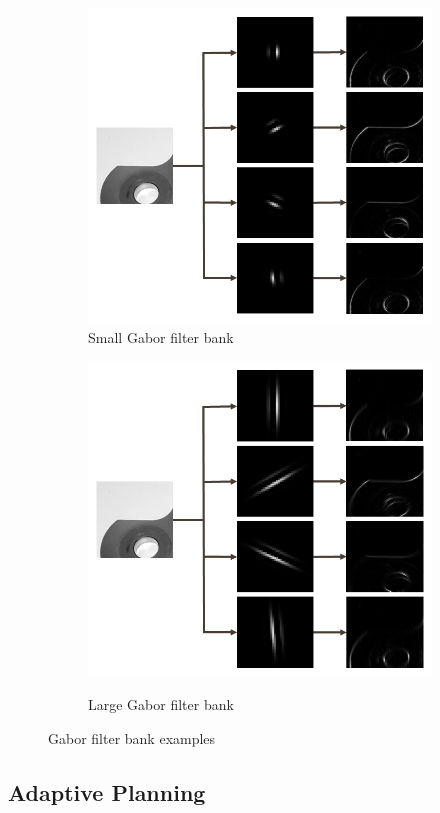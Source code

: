 \documentclass[letterpaper, 10 pt, conference]{ieeeconf}  %
\begin{document}
\begin{figure}
    \centering
    \begin{subfigure}[b]{.49\textwidth}
        \centering
        \includegraphics[width=.65\textwidth]{gabor_filter_small.png}
        \caption{Small Gabor filter bank}
        \vspace*{2mm}
        \label{fig:small gabor}
    \end{subfigure}
    \hfill
    \begin{subfigure}[b]{.49\textwidth}
        \centering
        {\includegraphics[width=.65\textwidth]{gabor_filter_large.png}}
        \caption{Large Gabor filter bank}
        \vspace*{2mm}
        \label{fig:large gabor}
    \end{subfigure}
    \caption{Gabor filter bank examples}
    \label{fig:gabor filter bank}
\end{figure}

\subsection{Adaptive Planning}
\end{document}
